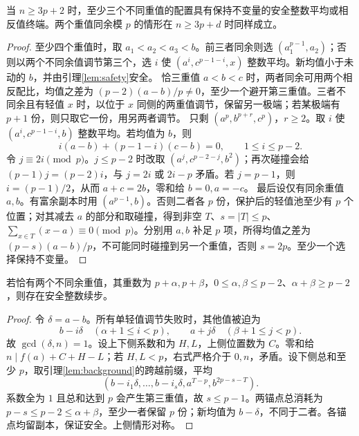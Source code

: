 \begin{lemma}\label{lem:heavy}
当 $n\ge3p+2$ 时，至少三个不同重值的配置具有保持不变量的安全整数平均或相反值终端。两个重值同余模 $p$ 的情形在 $n\ge3p+d$ 时同样成立。
\end{lemma}
\begin{proof}
至少四个重值时，取 $a_1<a_2<a_3<b$。前三者同余则选 $(a_1^{p-1},a_2)$；否则以两个不同余值调节第三个，选 $i$ 使 $(a^i,c^{p-1-i},x)$ 整数平均。新均值小于未动的 $b$，并由引理\ref{lem:safety}安全。
恰三重值 $a<b<c$ 时，两者同余可用两个相反配比，均值之差为 $(p-2)(a-b)/p\ne0$，至少一个避开第三重值。三者不同余且有轻值 $x$ 时，以位于 $x$ 同侧的两重值调节，保留另一极端；若某极端有 $p+1$ 份，则只取它一份，用另两者调节。
只剩 $(a^p,b^{p+r},c^p)$，$r\ge2$。取 $i$ 使 $(a^i,c^{p-1-i},b)$ 整数平均。若均值为 $b$，则
\[i(a-b)+(p-1-i)(c-b)=0,\qquad1\le i\le p-2.
\]
令 $j\equiv2i\pmod p$。$j\le p-2$ 时改取 $(a^j,c^{p-2-j},b^2)$；再次碰撞会给 $(p-1)j=(p-2)i$，与 $j=2i$ 或 $2i-p$ 矛盾。若 $j=p-1$，则 $i=(p-1)/2$，从而 $a+c=2b$，零和给 $b=0,a=-c$。
最后设仅有同余重值 $a,b$。有富余副本时用 $(a^{p-1},b)$。否则二者各 $p$ 份，保护后的轻值池至少有 $p$ 个位置；对其减去 $a$ 的部分和取碰撞，得到非空 $T$、$s=|T|\le p$、$\sum_{x\in T}(x-a)\equiv0\pmod p$。分别用 $a,b$ 补足 $p$ 项，所得均值之差为 $(p-s)(a-b)/p$，不可能同时碰撞到另一个重值，否则 $s=2p$。至少一个选择保持不变量。
\end{proof}

\begin{lemma}\label{lem:two-heavy}
若恰有两个不同余重值，其重数为 $p+\alpha,p+\beta$，$0\le\alpha,\beta\le p-2$、$\alpha+\beta\ge p-2$，则存在安全整数续步。
\end{lemma}
\begin{proof}
令 $\delta=a-b$。所有单轻值调节失败时，其他值被迫为
\[
b-i\delta\quad(\alpha+1\le i<p),\qquad
a+j\delta\quad(\beta+1\le j<p).
\]
故 $\gcd(\delta,n)=1$。设上下侧系数和为 $H,L$，上侧位置数为 $C$。零和给 $n\mid f(a)+C+H-L$；若 $H,L<p$，右式严格介于 $0,n$，矛盾。设下侧总和至少 $p$，取引理\ref{lem:background}的跨越前缀，平均
\[(b-i_1\delta,\ldots,b-i_s\delta,a^{T-p},b^{2p-s-T}).
\]
系数全为 $1$ 且总和达到 $p$ 会产生第三重值，故 $s\le p-1$。两锚点总消耗为 $p-s\le p-2\le\alpha+\beta$，至少一者保留 $p$ 份；新均值为 $b-\delta$，不同于二者。各锚点均留副本，保证安全。上侧情形对称。
\end{proof}

